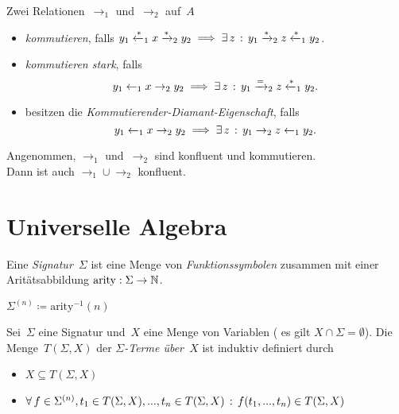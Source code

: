 \documentclass{cheat-sheet}
\newcommand{\from}{\leftarrow}
\newcommand{\reducesTo}{\xrightarrow{*}}
\newcommand{\reducesFrom}{\xleftarrow{*}}
\newcommand{\toOrEq}{\xrightarrow{=}}
\DeclareMathOperator{\arity}{arity} %
\begin{document}
\begin{defn}
  Zwei Relationen~${\to_1}$ und~${\to_2}$ auf~$A$
  \begin{itemize}
    \item \emph{kommutieren}, falls $y_1 \reducesFrom_1 x \reducesTo_2 y_2 \implies \ex{z} y_1 \reducesTo_2 z \reducesFrom_1 y_2$.
    \item \emph{kommutieren stark}, falls
    \[
      y_1 \from_1 x \to_2 y_2 \implies \ex{z} y_1 \toOrEq_2 z \reducesFrom_1 y_2.
    \]
    \item besitzen die \emph{Kommutierender-Diamant-Eigenschaft}, falls
    \[
      y_1 \from_1 x \to_2 y_2 \implies \ex{z} y_1 \to_2 z \from_1 y_2.
    \]
  \end{itemize}
\end{defn}

\begin{lem}
  Angenommen, $\to_1$ und~$\to_2$ sind konfluent und kommutieren. \\
  Dann ist auch ${\to_1} \cup {\to_2}$ konfluent.
\end{lem}

\section{Universelle Algebra}


\begin{defn}
  Eine \emph{Signatur}~$\Sigma$ ist eine Menge von \textit{Funktionssymbolen} zusammen mit einer Aritätsabbildung $\arity : \Sigma \to \N$.
\end{defn}

\begin{nota}
  $\Sigma^{(n)} \coloneqq \mathrm{arity}^{-1}(n)$
\end{nota}

\begin{defn}
  Sei~$\Sigma$ eine Signatur und~$X$ eine Menge von Variablen (\dh{} es gilt $X \cap \Sigma = \emptyset$).
  Die Menge~$T(\Sigma, X)$ der \emph{$\Sigma$-Terme über~$X$} ist induktiv definiert durch
  \begin{itemize}
    \item $X \subseteq T(\Sigma, X)$
    \item $\forall \, {f \in \Sigma^{(n)}, t_1 \in T(\Sigma, X), ..., t_n \in T(\Sigma, X)} \,:\, f(t_1, ..., t_n) \in T(\Sigma, X)$
  \end{itemize}
\end{defn}
\end{document}
